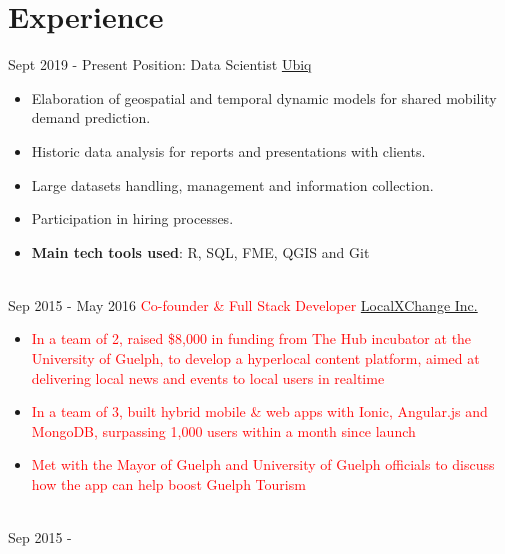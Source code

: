 \documentclass[letterpaper]{twentysecondcv} %
\begin{document}
\makeprofile %
 

\section{Experience}

\begin{twenty} %
\twentyitem
    	{Sept 2019 -}
		{Present}
        {Position: Data Scientist}
        {\href{http://www.ubiq.ai/}{Ubiq}}
        {}
        {\begin{itemize}
        \item Elaboration of geospatial and temporal dynamic models for shared mobility demand prediction.
        \item Historic data analysis for reports and presentations with clients.
        \item Large datasets handling, management and information collection. 
        \item Participation in hiring processes. 
        \item \textbf{Main tech tools used}: R, SQL, FME, QGIS and Git
        \end{itemize}}
        \\
	\twentyitem
    	{Sep 2015 -}
		{May 2016}
        {\textcolor{red}{Co-founder \& Full Stack Developer}}
        {\href{http://www.localxchange.ca/}{LocalXChange Inc.}}
        {}
        {
        {\begin{itemize}
        \item \textcolor{red}{In a team of 2, raised \$8,000 in funding from The Hub incubator at the University of Guelph, to develop a hyperlocal content platform, aimed at delivering local news and events to local users in realtime}
        \item \textcolor{red}{In a team of 3, built hybrid mobile \& web apps with Ionic, Angular.js and MongoDB, surpassing 1,000 users within a month since launch}
        \item \textcolor{red}{Met with the Mayor of Guelph and University of Guelph officials to discuss how the app can help boost Guelph Tourism} 
    \end{itemize}}
        }
    \\   
    \twentyitem
   		{Sep 2015 -}

\end{twenty}
\end{document}
